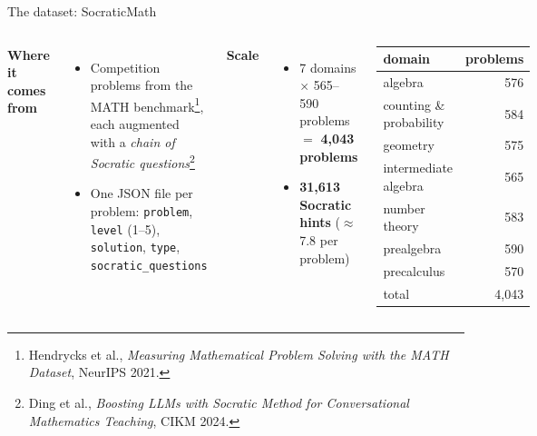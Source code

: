 \documentclass[10pt,aspectratio=169]{beamer}
\begin{document}
\begin{frame}{The dataset: SocraticMath}
  \begin{columns}[T]
    \textbf{Where it comes from}
    \begin{itemize}
      \item Competition problems from the MATH benchmark\footnote{\tiny Hendrycks et al., \emph{Measuring Mathematical Problem Solving with the MATH Dataset}, NeurIPS 2021.}, each augmented with a
            \emph{chain of Socratic questions}\footnote{\tiny Ding et al., \emph{Boosting LLMs with Socratic Method for Conversational Mathematics Teaching}, CIKM 2024.}
      \item One JSON file per problem:
            \texttt{problem}, \texttt{level} (1--5), \texttt{solution}, \texttt{type},
     \texttt{socratic\_questions}
    \end{itemize}
    \medskip
    \pause
    \textbf{Scale}
    \begin{itemize}
      \item 7 domains $\times$ 565--590 problems $=$ \textbf{4{,}043 problems}
      \item \textbf{31{,}613 Socratic hints} ($\approx$ 7.8 per problem)
    \end{itemize}
    \pause
    \begin{center}
      \small
      \begin{tabular}{lr}
        \toprule
        domain & problems \\
        \midrule
        algebra & 576 \\
        counting \& probability & 584 \\
        geometry & 575 \\
        intermediate algebra & 565 \\
        number theory & 583 \\
        prealgebra & 590 \\
        precalculus & 570 \\
        \midrule
        total & 4{,}043 \\
        \bottomrule
      \end{tabular}
    \end{center}
  \end{columns}
\end{frame}
\end{document}
